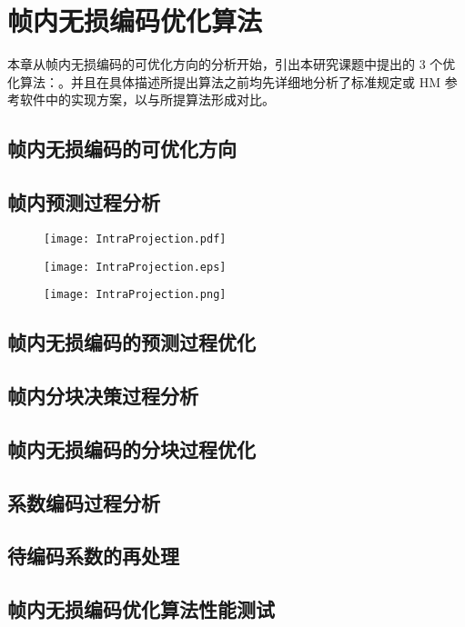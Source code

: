 \chapter{帧内无损编码优化算法}
\label{cha:c3}
本章从帧内无损编码的可优化方向的分析开始，引出本研究课题中提出的 3 个优化算法：。并且在具体描述所提出算法之前均先详细地分析了标准规定或 HM 参考软件中的实现方案，以与所提算法形成对比。

\section{帧内无损编码的可优化方向}

\section{帧内预测过程分析}
\label{cha:IntraPredDetail}
\begin{figure}
    \centering
    \texttt{[image: IntraProjection.pdf]}
\end{figure}
\begin{figure}
    \centering
    \texttt{[image: IntraProjection.eps]}
\end{figure}
\begin{figure}
    \centering
    \texttt{[image: IntraProjection.png]}
\end{figure}

\section{帧内无损编码的预测过程优化}

\section{帧内分块决策过程分析}

\section{帧内无损编码的分块过程优化}

\section{系数编码过程分析}

\section{待编码系数的再处理}

\section{帧内无损编码优化算法性能测试}